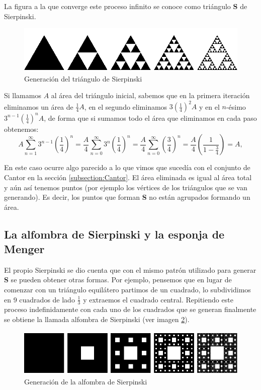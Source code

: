 La figura a la que converge este proceso infinito se conoce como triángulo \textbf{S} de Sierpinski.

\begin{figure} [h]
\centering
\includegraphics[scale = 0.6]{img/Sierpinski-triangle.png}
\caption{Generación del triángulo de Sierpinski}
 \label{fig:triangulo-Sierpinski}
\end{figure}

Si llamamos $A$ al área del triángulo inicial, sabemos que en la primera iteración eliminamos un área de $\frac 1 4 A$, en el segundo eliminamos $3 \left(\frac 1 4\right)^2 A$ y en el $n$-ésimo $3^{n-1}\left(\frac 1 4\right)^n A$, de forma que si sumamos todo el área que eliminamos en cada paso obtenemos:
$$
A \sum_{n=1}^\infty 3^{n-1}\left(\frac 1 4\right)^n  = \frac A 4  \sum_{n=0}^\infty 3^n\left(\frac 1 4\right)^n =  \frac A 4  \sum_{n=0}^\infty \left(\frac 3 4\right)^n = \frac{A}{4} \left(\frac{1}{1-\frac{3}{4}}\right) = A,
$$

En este caso ocurre algo parecido a lo que vimos que sucedía con el conjunto de Cantor en la sección \ref{subsection:Cantor}. El área eliminada es igual al área total y aún así tenemos puntos (por ejemplo los vértices de los triángulos que se van generando). Es decir, los puntos que forman \textbf{S} no están agrupados formando un área.

\subsection{La alfombra de Sierpinski y la esponja de Menger}
\label{subsection:alfombra-esponja}

El propio Sierpinski se dio cuenta que con el mismo patrón utilizado para generar \textbf{S} se pueden obtener otras formas. Por ejemplo, pensemos que en lugar de comenzar con un triángulo equilátero partimos de un cuadrado, lo subdividimos en 9 cuadrados de lado $\frac 1 3$ y extraemos el cuadrado central. Repitiendo este proceso indefinidamente con cada uno de los cuadrados que se generan finalmente se obtiene la llamada alfombra de Sierpinski (ver imagen \ref{fig:alfombra-Sierpinski}).

\begin{figure} [h]
\centering
\includegraphics[scale = 0.6]{img/Sierpinski-carpet.png}
\caption{Generación de la alfombra de Sierpinski}
 \label{fig:alfombra-Sierpinski}
\end{figure}


